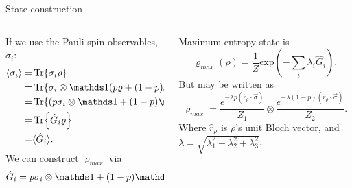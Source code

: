 \begin{frame}{State construction}
    \begin{columns}
        \begin{column}{0.5\textwidth}
            If we use the Pauli spin observables, $\sigma_{i}$:
            \begin{align*}
                \langle \sigma_{i}\rangle=&\Tr{\sigma_{i} \rho}\\
                =&\Tr{\sigma_{i}\otimes\Id(p\varrho+(1-p)S\varrho S)}\\
                =&\Tr{(p\sigma_{i}\otimes\Id+(1-p)\Id\otimes\sigma_{i})\varrho}\\
                =&\Tr{\hat{G}_{i}\varrho}\\
                =&\langle \hat{G}_{i}\rangle.
            \end{align*}
            We can construct $\varrho_{max}$ via
            \begin{equation*}
                \hat{G}_{i}=p\sigma_{i}\otimes\Id+(1-p)\Id\otimes\sigma_{i}.
            \end{equation*}
        \end{column}
        \begin{column}{0.5\textwidth}
            Maximum entropy state is
            \begin{equation*}
                \varrho_{max}(\rho)=\frac{1}{Z}\text{exp}(-\sum_{i}\lambda_{i}\hat{G}_{i}).
            \end{equation*}
            But may be written as
            \begin{equation*}
                \varrho_{max}=\frac{e^{-\lambda p(\hat{r}_{\rho}\cdot\vec{\sigma})}}{Z_{1}} \otimes \frac{e^{-\lambda(1-p)(\hat{r}_{\rho}\cdot\vec{\sigma})}}{Z_{2}}.
            \end{equation*}
            Where $\hat{r}_{\rho}$ is $\rho$'s unit Bloch vector, and $\lambda=\sqrt{\lambda^{2}_{1}+\lambda^{2}_{2}+\lambda^{2}_{3}}$.
        \end{column}
    \end{columns}
\end{frame}


